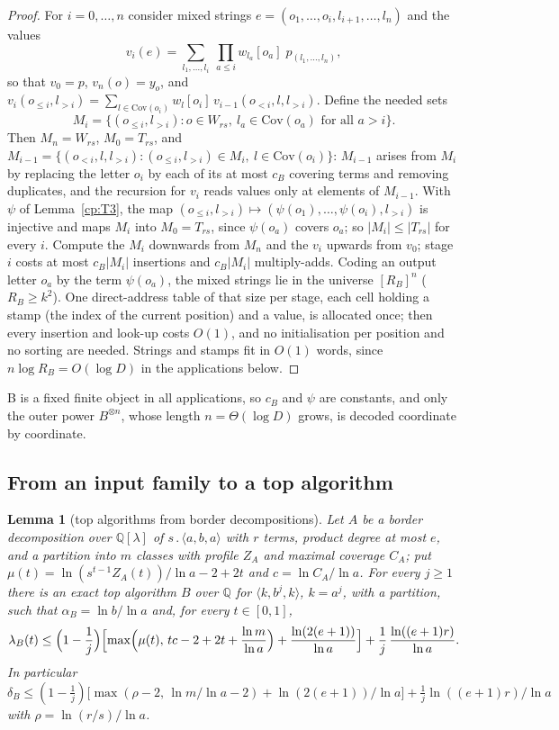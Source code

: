 \documentclass[11pt]{article}
\newtheorem{lemma}[theorem]{Lemma}
\theoremstyle{definition}
\theoremstyle{remark}
\providecommand{\Q}{\mathbb{Q}}
\newcommand{\abs}[1]{\lvert #1\rvert}
\newcommand{\mat}[3]{\langle #1,#2,#3\rangle} %
\newcommand{\cp}{\mathbin{.}}                 %
\newcommand{\Cov}{\mathrm{Cov}}               %
\newcommand{\cB}{c_B}                         %
\newcommand{\lamB}{\lambda_B}                 %
\newcommand{\delB}{\delta_B}                  %
\newcommand{\alB}{\alpha_B}                   %
\newcommand{\RB}{R_B}                         %
\begin{document}
\begin{proof}
For $i=0,\dots,n$ consider mixed strings $e=(o_1,\dots,o_i,l_{i+1},\dots,l_n)$ and the values
\[
v_i(e)=\sum_{l_1,\dots,l_i}\ \prod_{a\le i}w_{l_a}[o_a]\;p_{(l_1,\dots,l_n)},
\]
so that $v_0=p$, $v_n(o)=y_o$, and $v_i(o_{\le i},l_{>i})=\sum_{l\in\Cov(o_i)}w_l[o_i]\,v_{i-1}(o_{<i},l,l_{>i})$. Define the needed sets
\[
M_i=\{(o_{\le i},l_{>i}):o\in W_{rs},\ l_a\in\Cov(o_a)\text{ for all }a>i\}.
\]
Then $M_n=W_{rs}$, $M_0=T_{rs}$, and $M_{i-1}=\{(o_{<i},l,l_{>i}):(o_{\le i},l_{>i})\in M_i,\ l\in\Cov(o_i)\}$: $M_{i-1}$ arises from $M_i$ by replacing the letter $o_i$ by each of its at most $\cB$ covering terms and removing duplicates, and the recursion for $v_i$ reads values only at elements of $M_{i-1}$. With $\psi$ of Lemma~\ref{cp:T3}, the map $(o_{\le i},l_{>i})\mapsto(\psi(o_1),\dots,\psi(o_i),l_{>i})$ is injective and maps $M_i$ into $M_0=T_{rs}$, since $\psi(o_a)$ covers $o_a$; so $\abs{M_i}\le\abs{T_{rs}}$ for every $i$. Compute the $M_i$ downwards from $M_n$ and the $v_i$ upwards from $v_0$; stage $i$ costs at most $\cB\abs{M_i}$ insertions and $\cB\abs{M_i}$ multiply-adds.
Coding an output letter $o_a$ by the term $\psi(o_a)$, the mixed strings lie in the universe $[\RB]^n$ ($\RB\ge k^2$). One direct-address table of that size per stage, each cell holding a stamp (the index of the current position) and a value, is allocated once; then every insertion and look-up costs $O(1)$, and no initialisation per position and no sorting are needed. Strings and stamps fit in $O(1)$ words, since $n\log\RB=O(\log D)$ in the applications below.
\end{proof}

B is a fixed finite object in all applications, so $\cB$ and $\psi$ are constants, and only the outer power $B^{\otimes n}$, whose length $n=\Theta(\log D)$ grows, is decoded coordinate by coordinate.

\subsection{From an input family to a top algorithm}\label{cp:sec:lemma4}

\begin{lemma}[top algorithms from border decompositions]\label{cp:T5:lemma4}
Let $A$ be a border decomposition over $\Q[\lambda]$ of $s\cp\mat aba$ with $r$ terms, product degree at most $e$, and a partition into $m$ classes with profile $Z_A$ and maximal coverage $C_A$; put $\mu(t)=\ln(s^{t-1}Z_A(t))/\ln a-2+2t$ and $c=\ln C_A/\ln a$. For every $j\ge1$ there is an exact top algorithm $B$ over $\Q$ for $\mat k{b^j}k$, $k=a^j$, with a partition, such that $\alB=\ln b/\ln a$ and, for every $t\in[0,1]$,
\[
\lamB(t)\le\Bigl(1-\frac1j\Bigr)\Bigl[\max\Bigl(\mu(t),\,tc-2+2t+\frac{\ln m}{\ln a}\Bigr)+\frac{\ln(2(e+1))}{\ln a}\Bigr]+\frac1j\,\frac{\ln((e+1)r)}{\ln a}.
\]
In particular $\delB\le(1-\frac1j)\bigl[\max(\rho-2,\,\ln m/\ln a-2)+\ln(2(e+1))/\ln a\bigr]+\frac1j\ln((e+1)r)/\ln a$ with $\rho=\ln(r/s)/\ln a$.
\end{lemma}
\end{document}
